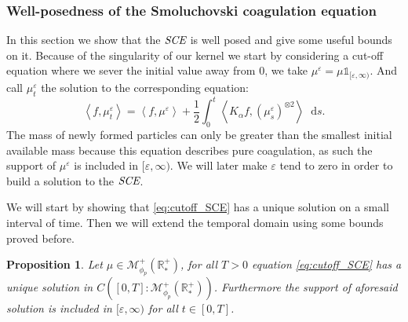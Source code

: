\documentclass[11pt,a4paper]{article}
\newcommand{\RRP}{\mathbb{R}^+_*}
\newcommand{\MC}{\mathcal{M}}
\newcommand{\SCE}{\emph{SCE}}
\newcommand{\brac}[1]{\left\langle#1\right\rangle}
\newcommand{\dd}{\mathop{}\!\mathrm{d}}
\newtheorem{proposition}[theorem]{Proposition}
\begin{document}
\subsubsection{Well-posedness of the Smoluchovski coagulation equation}
In this section we show that the $\SCE$ is well posed and give some useful bounds on it. Because of the singularity of our kernel we start by considering a cut-off equation where we sever the initial value away from $0$, we take $\mu^\varepsilon = \mu\mathds{1}_{[\varepsilon,\infty)}$. And call $\mu^\varepsilon_t$ the solution to the corresponding equation:
\begin{equation}\label{eq:cutoff_SCE}
    \brac{f, \mu^\varepsilon_t} = \brac{f,\mu^\varepsilon} + \dfrac12\int_0^t \brac{K_\alpha f,\left(\mu^\varepsilon_s\right)^{\otimes 2}} \dd s.
\end{equation}
The mass of newly formed particles can only be greater than the smallest initial available mass because this equation describes pure coagulation, as such the support of $\mu^\varepsilon$ is included in $[\varepsilon,\infty)$. We will later make $\varepsilon$ tend to zero in order to build a solution to the $\SCE$.

We will start by showing that \eqref{eq:cutoff_SCE} has a unique solution on a small interval of time. Then we will extend the temporal domain using some  bounds proved before.
\begin{proposition}\label{prop:well-posedness-cutoff-smol}
    Let $\mu \in \MC^+_{\phi_p}(\RRP)$, for all $T > 0$ equation \eqref{eq:cutoff_SCE} has a unique solution in $C\left([0,T]:\MC^+_{\phi_p}(\RRP)\right)$. Furthermore the support of aforesaid solution is included in $[\varepsilon,\infty)$ for all $t \in [0,T]$.
\end{proposition}
\end{document}
